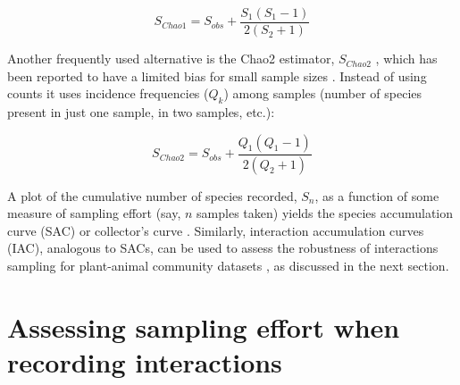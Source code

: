 \documentclass[12pt]{article}
\begin{document}
$$S_{Chao1}= S_{obs} + \frac{S_1 (S_1-1)}{2(S_2+1)}$$ 

Another frequently used alternative is the Chao2 estimator, $S_{Chao2}$ \citep{Gotelli:2001uo}, which has been reported to have a limited bias for small sample sizes \citep{Colwell:1994vt,Chao:2005wp}. Instead of using counts it uses incidence frequencies ($Q_k$) among samples (number of species present in just one sample, in two samples, etc.): 

$$S_{Chao2}= S_{obs} + \frac{Q_1 (Q_1-1)}{2(Q_2+1)}$$ 

A plot of the cumulative number of species recorded, $S_n$, as a function of some measure of sampling effort (say, $n$ samples taken) yields the species accumulation curve (SAC) or collector's curve \citep{Colwell:1994vt}. Similarly, interaction accumulation curves (IAC), analogous to SACs, can be used to assess the robustness of interactions sampling for plant-animal community datasets \citep{E31/2562,Jordano:2009c,Olesen:2011a}, as discussed in the next section.  

\section*{Assessing sampling effort when recording interactions}
\label{assessingsamplingeffortwhenrecordinginteractions}
\end{document}
